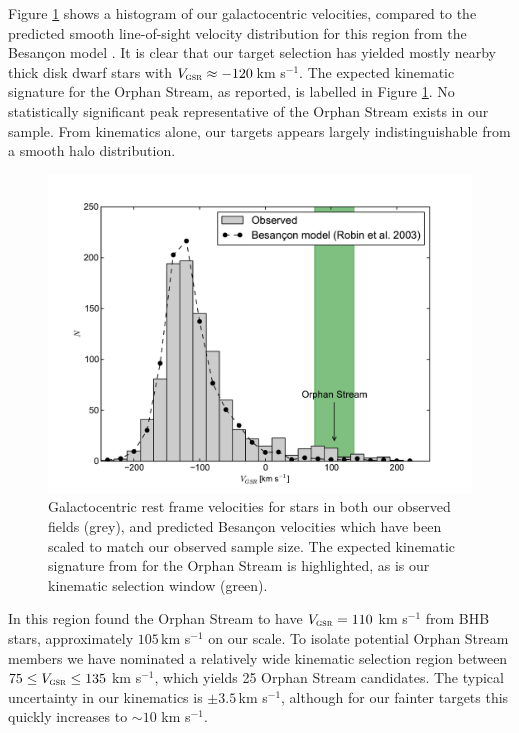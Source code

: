 \documentclass{emulateapj}
\begin{document}
Figure \ref{fig:velocities} shows a histogram of our galactocentric velocities, compared to the predicted smooth line-of-sight velocity distribution for this region from the Besan\c{c}on model \citep{Robin;et-al_2003}. It is clear that our target selection has yielded mostly nearby thick disk dwarf stars with $V_{\textsc{gsr}} \approx -120$\,km s$^{-1}$. The expected kinematic signature for the Orphan Stream, as \citet{Newberg;et-al_2010} reported, is labelled in Figure \ref{fig:velocities}. No statistically significant peak representative of the Orphan Stream exists in our sample. From kinematics alone, our targets appears largely indistinguishable from a smooth halo distribution.

\begin{figure}[h]
	\includegraphics[width=\columnwidth]{./figures/vgsr-histogram.pdf}
	\caption{Galactocentric rest frame velocities for stars in both our observed fields (grey), and predicted Besan\c{c}on velocities which have been scaled to match our observed sample size. The expected kinematic signature from \citet{Newberg;et-al_2010} for the Orphan Stream is highlighted, as is our kinematic selection window (green).}
	\label{fig:velocities}
\end{figure}

In this region \citet{Newberg;et-al_2010} found the Orphan Stream to have $V_{\textsc{gsr}} = 110$ km s$^{-1}$ from BHB stars, approximately $105$\,km s$^{-1}$ on our scale. To isolate potential Orphan Stream members we have nominated a relatively wide kinematic selection region between $75 \leq V_{\textsc{gsr}} \leq 135$ km s$^{-1}$, which yields 25 Orphan Stream candidates. The typical uncertainty in our kinematics is $\pm{}3.5$\,km s$^{-1}$, although for our fainter targets this quickly increases to $\sim10$ km s$^{-1}$.
\end{document}
